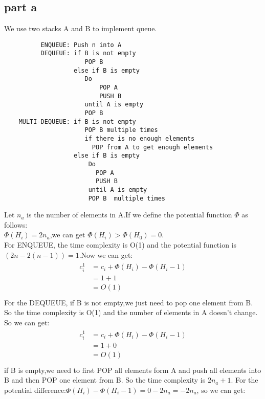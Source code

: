 \documentclass[paper=a4, fontsize=11pt]{scrartcl} %
\numberwithin{equation}{section} %
\numberwithin{figure}{section} %
\numberwithin{table}{section} %
\begin{document}
\subsection{\textbf{part a}}
We use two stacks A and B to implement queue.
\begin{verbatim}
          ENQUEUE: Push n into A
          DEQUEUE: if B is not empty
                      POP B
                   else if B is empty
                      Do
                          POP A 
                          PUSH B
                      until A is empty
                      POP B
    MULTI-DEQUEUE: if B is not empty
                      POP B multiple times
                      if there is no enough elements
                        POP from A to get enough elements 
                   else if B is empty
                       Do
                         POP A 
                         PUSH B
                       until A is empty
                       POP B  multiple times
\end{verbatim} 
Let $n_a$ is the number of elements in A.If we define the potential function $\Phi$  as follows:\\
$\Phi(H_i)=2n_a$,we can get $\Phi(H_i)>\Phi(H_0)=0$.\\
For ENQUEUE, the time complexity is O(1) and the potential function is $(2n-2(n-1))=1$.Now we can get:
\begin{align*}
\begin{split}
c_i^1 &=c_i+\Phi(H_i)-\Phi(H_i-1)\\
      &=1+1\\
      &=O(1)\\
\end{split}
\end{align*}
For the DEQUEUE, if B is not empty,we just need to pop one element from B. So the time complexity is O(1) and the number of elements in A doesn't change. So we can get:\\
\begin{align*}
\begin{split}
c_i^1 &=c_i+\Phi(H_i)-\Phi(H_i-1)\\
      &=1+0\\
      &=O(1)\\
\end{split}
\end{align*}
if B is empty,we need to first POP all elements form A and push all elements into B and then POP one element from B. So the time complexity is $2n_a+1$. For the potential difference:$\Phi(H_i)-\Phi(H_i-1)=0-2n_a=-2n_a$, so we can get:\\
\end{document}
